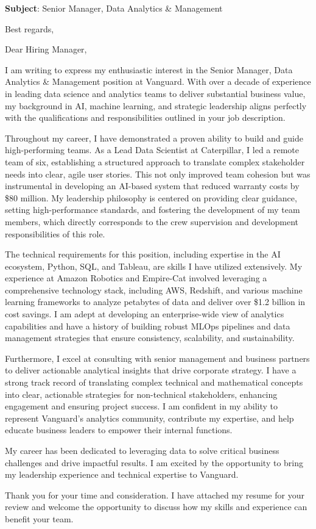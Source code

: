 \documentclass[11pt,a4paper,roman]{moderncv}
\newcommand{\jobtitle}{Senior Manager, Data Analytics & Management}
\begin{document}
\date{\today}
\opening{\textbf{Subject}: \jobtitle}
\closing{Best regards,}
\makelettertitle

\vspace{0.25cm}


Dear Hiring Manager,

I am writing to express my enthusiastic interest in the Senior Manager, Data Analytics \& Management position at Vanguard. With over a decade of experience in leading data science and analytics teams to deliver substantial business value, my background in AI, machine learning, and strategic leadership aligns perfectly with the qualifications and responsibilities outlined in your job description.

Throughout my career, I have demonstrated a proven ability to build and guide high-performing teams. As a Lead Data Scientist at Caterpillar, I led a remote team of six, establishing a structured approach to translate complex stakeholder needs into clear, agile user stories. This not only improved team cohesion but was instrumental in developing an AI-based system that reduced warranty costs by \$80 million. My leadership philosophy is centered on providing clear guidance, setting high-performance standards, and fostering the development of my team members, which directly corresponds to the crew supervision and development responsibilities of this role.

The technical requirements for this position, including expertise in the AI ecosystem, Python, SQL, and Tableau, are skills I have utilized extensively. My experience at Amazon Robotics and Empire-Cat involved leveraging a comprehensive technology stack, including AWS, Redshift, and various machine learning frameworks to analyze petabytes of data and deliver over \$1.2 billion in cost savings. I am adept at developing an enterprise-wide view of analytics capabilities and have a history of building robust MLOps pipelines and data management strategies that ensure consistency, scalability, and sustainability.

Furthermore, I excel at consulting with senior management and business partners to deliver actionable analytical insights that drive corporate strategy. I have a strong track record of translating complex technical and mathematical concepts into clear, actionable strategies for non-technical stakeholders, enhancing engagement and ensuring project success. I am confident in my ability to represent Vanguard's analytics community, contribute my expertise, and help educate business leaders to empower their internal functions.

My career has been dedicated to leveraging data to solve critical business challenges and drive impactful results. I am excited by the opportunity to bring my leadership experience and technical expertise to Vanguard.

Thank you for your time and consideration. I have attached my resume for your review and welcome the opportunity to discuss how my skills and experience can benefit your team.


 
\makeletterclosing
\end{document}

